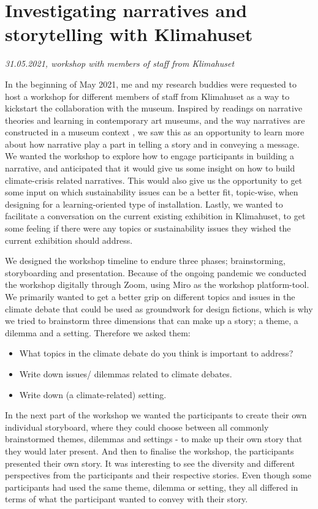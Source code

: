 
\section{Investigating narratives and storytelling with Klimahuset}
\par
\emph{31.05.2021, workshop with members of staff from Klimahuset}
\par

In the beginning of May 2021, me and my research buddies were requested to host a workshop for different members of staff from Klimahuset as a way to kickstart the collaboration with the museum. Inspired by readings on narrative theories and learning in contemporary art museums, and the way narratives are constructed in a museum context \autocite{narrative_sitzia}, we saw this as an opportunity to learn more about how narrative play a part in telling a story and in conveying a message. We wanted the workshop to explore how to engage participants in building a narrative, and anticipated that it would give us some insight on how to build climate-crisis related narratives. This would also give us the opportunity to get some input on which sustainability issues can be a better fit, topic-wise, when designing for a learning-oriented type of installation. Lastly, we wanted to facilitate a conversation on the current existing exhibition in Klimahuset, to get some feeling if there were any topics or sustainability issues they wished the current exhibition should address.

We designed the workshop timeline to endure three phases; brainstorming, storyboarding and presentation. Because of the ongoing pandemic we conducted the workshop digitally through Zoom, using Miro as the workshop platform-tool. We primarily wanted to get a better grip on different topics and issues in the climate debate that could be used as groundwork for design fictions, which is why we tried to brainstorm three dimensions that can make up a story; a theme, a dilemma and a setting. Therefore we asked them:

\begin{itemize}
    \item What topics in the climate debate do you think is important to address?
    \item Write down issues/ dilemmas related to climate debates.
    \item Write down (a climate-related) setting.
\end{itemize}

In the next part of the workshop we wanted the participants to create their own individual storyboard, where they could choose between all commonly brainstormed themes, dilemmas and settings - to make up their own story that they would later present. And then to finalise the workshop, the participants presented their own story. It was interesting to see the diversity and different perspectives from the participants and their respective stories. Even though some participants had used the same theme, dilemma or setting, they all differed in terms of what the participant wanted to convey with their story. 

